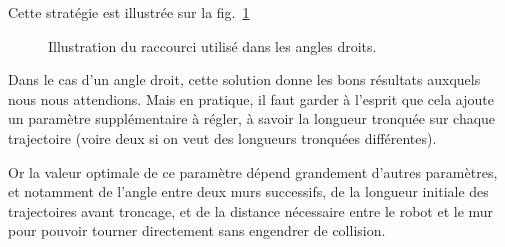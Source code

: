 \documentclass[french,A4paper,]{book}
\begin{document}
Cette stratégie est illustrée sur la fig.~\ref{fig:dubins}

\begin{figure}
\centering

\hspace*{\fill}
 \hfill%
\hspace*{\fill}

\caption{Illustration du raccourci utilisé dans les angles droits.}

\label{fig:dubins}

\end{figure}

Dans le cas d'un angle droit, cette solution donne les bons résultats
auxquels nous nous attendions. Mais en pratique, il faut garder à
l'esprit que cela ajoute un paramètre supplémentaire à régler, à savoir
la longueur tronquée sur chaque trajectoire (voire deux si on veut des
longueurs tronquées différentes).

Or la valeur optimale de ce paramètre dépend grandement d'autres
paramètres, et notamment de l'angle entre deux murs successifs, de la
longueur initiale des trajectoires avant troncage, et de la distance
nécessaire entre le robot et le mur pour pouvoir tourner directement
sans engendrer de collision.
\end{document}

